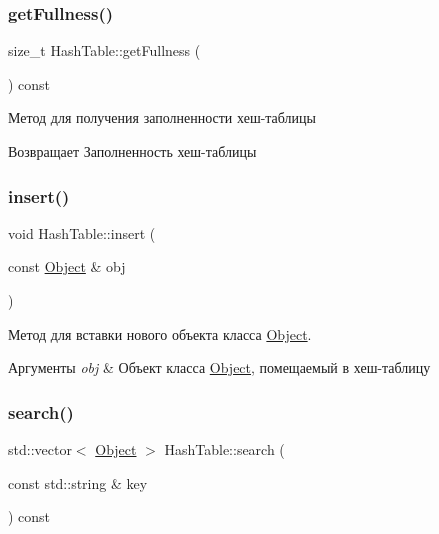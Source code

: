 \subsubsection{\texorpdfstring{get\+Fullness()}{getFullness()}}
{\footnotesize\ttfamily size\+\_\+t Hash\+Table\+::get\+Fullness (\begin{DoxyParamCaption}{ }\end{DoxyParamCaption}) const}



Метод для получения заполненности хеш-\/таблицы 

\begin{DoxyReturn}{Возвращает}
Заполненность хеш-\/таблицы 
\end{DoxyReturn}
\mbox{\label{classHashTable_a59ca87e22b811a05fa83b7dd9d8b94a1}} 
\subsubsection{\texorpdfstring{insert()}{insert()}}
{\footnotesize\ttfamily void Hash\+Table\+::insert (\begin{DoxyParamCaption}\item[{const \mbox{\hyperlink{structObject}{Object}} \&}]{obj }\end{DoxyParamCaption})}



Метод для вставки нового объекта класса \mbox{\hyperlink{structObject}{Object}}. 


\begin{DoxyParams}{Аргументы}
{\em obj} & Объект класса \mbox{\hyperlink{structObject}{Object}}, помещаемый в хеш-\/таблицу \\
\hline
\end{DoxyParams}
\mbox{\label{classHashTable_a9629c6b3cc56102e36d25eb0f10df79f}} 
\subsubsection{\texorpdfstring{search()}{search()}}
{\footnotesize\ttfamily std\+::vector$<$ \mbox{\hyperlink{structObject}{Object}} $>$ Hash\+Table\+::search (\begin{DoxyParamCaption}\item[{const std\+::string \&}]{key }\end{DoxyParamCaption}) const}



